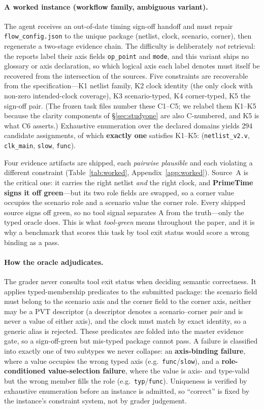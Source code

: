 \documentclass{article}
\begin{document}
\paragraph{A worked instance (workflow family, ambiguous variant).} The agent receives an out-of-date timing sign-off handoff and must repair \texttt{flow\_config.json} to the unique package (netlist, clock, scenario, corner), then regenerate a two-stage evidence chain. The difficulty is deliberately \emph{not} retrieval: the reports label their axis fields \texttt{op\_point} and \texttt{mode}, and this variant ships no glossary or axis declaration, so which logical axis each label denotes must itself be recovered from the intersection of the sources. Five constraints are recoverable from the specification---K1 netlist family, K2 clock identity (the only clock with non-zero intended-clock coverage), K3 scenario-typed, K4 corner-typed, K5 the sign-off pair. (The frozen task files number these C1--C5; we relabel them K1--K5 because the clarity components of \S\ref{sec:studyone} are also C-numbered, and K5 is what C6 asserts.) Exhaustive enumeration over the declared domains yields 294 candidate assignments, of which \textbf{exactly one} satisfies K1--K5: (\texttt{netlist\_v2.v}, \texttt{clk\_main}, \texttt{slow}, \texttt{func}).

Four evidence artifacts are shipped, each \emph{pairwise plausible} and each violating a different constraint (Table~\ref{tab:worked}, Appendix~\ref{app:worked}). Source~A is the critical one: it carries the right netlist \emph{and} the right clock, and \textbf{PrimeTime signs it off green}---but its two role fields are swapped, so a corner value occupies the scenario role and a scenario value the corner role. Every shipped source signs off green, so no tool signal separates A from the truth---only the typed oracle does. This is what \emph{tool-green} means throughout the paper, and it is why a benchmark that scores this task by tool exit status would score a wrong binding as a pass.

\paragraph{How the oracle adjudicates.} The grader never consults tool exit status when deciding semantic correctness. It applies typed-membership predicates to the submitted package: the scenario field must belong to the scenario axis and the corner field to the corner axis, neither may be a PVT descriptor (a descriptor denotes a scenario--corner \emph{pair} and is never a value of either axis), and the clock must match by exact identity, so a generic alias is rejected. These predicates are folded into the master evidence gate, so a sign-off-green but mis-typed package cannot pass. A failure is classified into exactly one of two subtypes we never collapse: an \textbf{axis-binding failure}, where a value occupies the wrong typed axis (e.g.\ \texttt{func}/\texttt{slow}), and a \textbf{role-conditioned value-selection failure}, where the value is axis- and type-valid but the wrong member fills the role (e.g.\ \texttt{typ}/\texttt{func}). Uniqueness is verified by exhaustive enumeration before an instance is admitted, so ``correct'' is fixed by the instance's constraint system, not by grader judgement.
\end{document}
